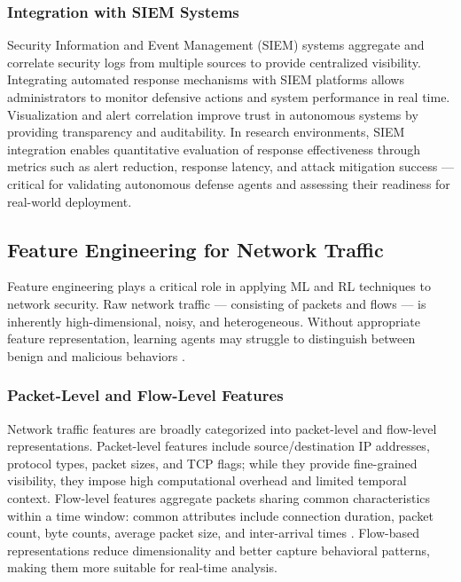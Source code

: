 \documentclass[conference]{IEEEtran}
\begin{document}
\subsubsection{Integration with SIEM Systems}
Security Information and Event Management (SIEM) systems aggregate and
correlate security logs from multiple sources to provide centralized
visibility. Integrating automated response mechanisms with SIEM platforms
allows administrators to monitor defensive actions and system performance in
real time. Visualization and alert correlation improve trust in autonomous
systems by providing transparency and auditability. In research environments,
SIEM integration enables quantitative evaluation of response effectiveness
through metrics such as alert reduction, response latency, and attack
mitigation success --- critical for validating autonomous defense agents and
assessing their readiness for real-world deployment.

\subsection{Feature Engineering for Network Traffic}

Feature engineering plays a critical role in applying ML and RL techniques
to network security. Raw network traffic --- consisting of packets and flows
--- is inherently high-dimensional, noisy, and heterogeneous. Without
appropriate feature representation, learning agents may struggle to
distinguish between benign and malicious behaviors \cite{ring2019survey}.

\subsubsection{Packet-Level and Flow-Level Features}
Network traffic features are broadly categorized into packet-level and
flow-level representations. Packet-level features include source/destination
IP addresses, protocol types, packet sizes, and TCP flags; while they
provide fine-grained visibility, they impose high computational overhead and
limited temporal context. Flow-level features aggregate packets sharing
common characteristics within a time window: common attributes include
connection duration, packet count, byte counts, average packet size, and
inter-arrival times \cite{sharafaldin2018cicids,moustafa2015unswnb15}.
Flow-based representations reduce dimensionality and better capture
behavioral patterns, making them more suitable for real-time analysis.
\end{document}
